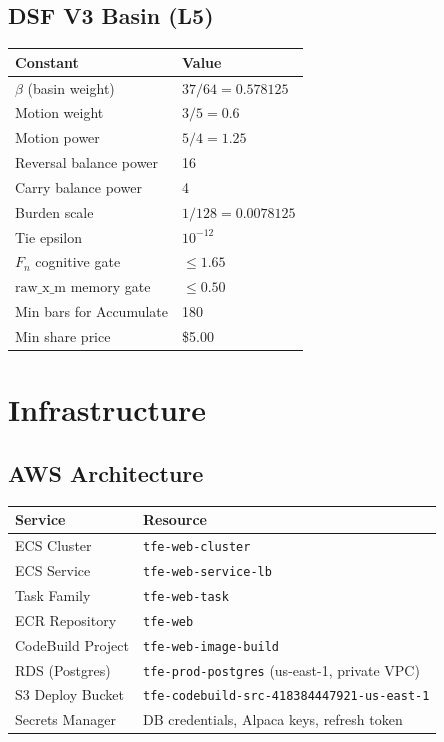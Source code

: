 \documentclass[11pt, a4paper]{article}
\begin{document}
\subsection{DSF V3 Basin (L5)}

\begin{center}
\begin{tabular}{@{}ll@{}}
\toprule
\textbf{Constant} & \textbf{Value} \\
\midrule
$\beta$ (basin weight) & $37/64 = 0.578125$ \\
Motion weight & $3/5 = 0.6$ \\
Motion power & $5/4 = 1.25$ \\
Reversal balance power & 16 \\
Carry balance power & 4 \\
Burden scale & $1/128 = 0.0078125$ \\
Tie epsilon & $10^{-12}$ \\
$F_n$ cognitive gate & $\leq 1.65$ \\
$\text{raw\_x\_m}$ memory gate & $\leq 0.50$ \\
Min bars for Accumulate & 180 \\
Min share price & \$5.00 \\
\bottomrule
\end{tabular}
\end{center}

\section{Infrastructure}

\subsection{AWS Architecture}

\begin{center}
\begin{tabular}{@{}ll@{}}
\toprule
\textbf{Service} & \textbf{Resource} \\
\midrule
ECS Cluster & \texttt{tfe-web-cluster} \\
ECS Service & \texttt{tfe-web-service-lb} \\
Task Family & \texttt{tfe-web-task} \\
ECR Repository & \texttt{tfe-web} \\
CodeBuild Project & \texttt{tfe-web-image-build} \\
RDS (Postgres) & \texttt{tfe-prod-postgres} (us-east-1, private VPC) \\
S3 Deploy Bucket & \texttt{tfe-codebuild-src-418384447921-us-east-1} \\
Secrets Manager & DB credentials, Alpaca keys, refresh token \\
\bottomrule
\end{tabular}
\end{center}
\end{document}
